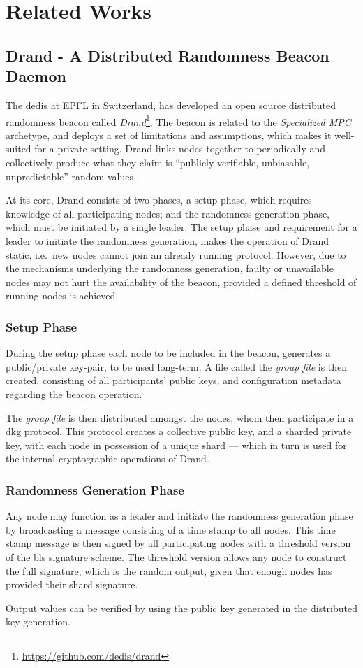 \section{Related Works}

\subsection{Drand - A Distributed Randomness Beacon Daemon}
\label{sub:drand_a_distributed_randomness_beacon_daemon}
The \gls{dedis} at EPFL in Switzerland, has developed an open source distributed randomness beacon called \textit{Drand}\footnote{\url{https://github.com/dedis/drand}}.
The beacon is related to the \textit{Specialized MPC} archetype, and deploys a set of limitations and assumptions, which makes it well-suited for a private setting.
Drand links nodes together to periodically and collectively produce what they claim is \enquote{publicly verifiable, unbiasable, unpredictable} random values.

At its core, Drand consists of two phases, a setup phase, which requires knowledge of all participating nodes; and the randomness generation phase, which must be initiated by a single leader.
The setup phase and requirement for a leader to initiate the randomness generation, makes the operation of Drand static, i.e.\ new nodes cannot join an already running protocol.
However, due to the mechanisms underlying the randomness generation, faulty or unavailable nodes may not hurt the availability of the beacon, provided a defined threshold of running nodes is achieved.

\subsubsection{Setup Phase}
During the setup phase each node to be included in the beacon, generates a public/private key-pair, to be used long-term.
A file called the \textit{group file} is then created, consisting of all participants' public keys, and configuration metadata regarding the beacon operation.

The \textit{group file} is then distributed amongst the nodes, whom then participate in a \gls{dkg} protocol.
This protocol creates a collective public key, and a sharded private key, with each node in possession of a unique shard --- which in turn is used for the internal cryptographic operations of Drand.

\subsubsection{Randomness Generation Phase}
Any node may function as a leader and initiate the randomness generation phase by broadcasting a message consisting of a time stamp to all nodes.
This time stamp message is then signed by all participating nodes with a threshold version of the \gls{bls} signature scheme.
The threshold version allows any node to construct the full signature, which is the random output, given that enough nodes has provided their shard signature.

Output values can be verified by using the public key generated in the distributed key generation.
